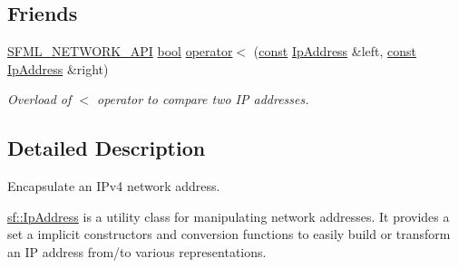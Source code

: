 \subsection*{Friends}
\begin{DoxyCompactItemize}
\item 
\hyperlink{sfml_2dep_2_s_f_m_l-2_84_82_2include_2_s_f_m_l_2_network_2_export_8hpp_ac5d46d4ffd98e947e28c54d051b338e7}{S\-F\-M\-L\-\_\-\-N\-E\-T\-W\-O\-R\-K\-\_\-\-A\-P\-I} \hyperlink{term__entry_8h_a002004ba5d663f149f6c38064926abac}{bool} \hyperlink{classsf_1_1_ip_address_a1c4ae6b26e9df765ca57d2715e9a7885}{operator$<$} (\hyperlink{term__entry_8h_a57bd63ce7f9a353488880e3de6692d5a}{const} \hyperlink{classsf_1_1_ip_address}{Ip\-Address} \&left, \hyperlink{term__entry_8h_a57bd63ce7f9a353488880e3de6692d5a}{const} \hyperlink{classsf_1_1_ip_address}{Ip\-Address} \&right)
\begin{DoxyCompactList}\small\item\em Overload of $<$ operator to compare two I\-P addresses. \end{DoxyCompactList}\end{DoxyCompactItemize}


\subsection{Detailed Description}
Encapsulate an I\-Pv4 network address. 

\hyperlink{classsf_1_1_ip_address}{sf\-::\-Ip\-Address} is a utility class for manipulating network addresses. It provides a set a implicit constructors and conversion functions to easily build or transform an I\-P address from/to various representations.

